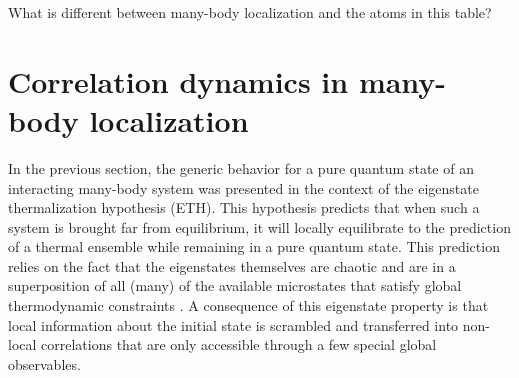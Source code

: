 
\begin{savequote}[75mm]
What is different between many-body localization and the atoms in this table?
\end{savequote}

%

\chapter{Correlation dynamics \newline in many-body localization}
\label{sec:ch5}

In the previous section, the generic behavior for a pure quantum state of an interacting many-body system was presented in the context of the eigenstate thermalization hypothesis (ETH). This hypothesis predicts that when such a system is brought far from equilibrium, it will locally equilibrate to the prediction of a thermal ensemble while remaining in a pure quantum state. This prediction relies on the fact that the eigenstates themselves are chaotic and are in a superposition of all (many) of the available microstates that satisfy global thermodynamic constraints \cite{Deutsch1991,Srednicki1994,Rigol2008,Neill2016,Kaufman2016}. A consequence of this eigenstate property is that local information about the initial state is scrambled and transferred into non-local correlations that are only accessible through a few special global observables.

